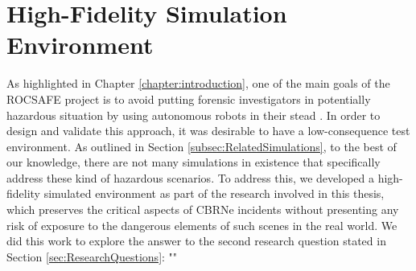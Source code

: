 \chapter{High-Fidelity Simulation Environment}\label{chap:HighFidelitySim}


As highlighted in Chapter \ref{chapter:introduction}, one of the main goals of the ROCSAFE project is to avoid putting forensic investigators in potentially hazardous situation by using autonomous robots in their stead \cite{Bagherzadeh2017ROCSAFE:Incidents}. In order to design and validate this approach, it was desirable to have a low-consequence test environment. As outlined in Section \ref{subsec:RelatedSimulations}, to the best of our knowledge, there are not many simulations in existence that specifically address these kind of hazardous scenarios. To address this, we developed a high-fidelity simulated environment as part of the research involved in this thesis, which preserves the critical aspects of CBRNe incidents without presenting any risk of exposure to the dangerous elements of such scenes in the real world. We did this work to explore the answer to the second research question stated in Section \ref{sec:ResearchQuestions}:
\newline
"\textit{}"\par

